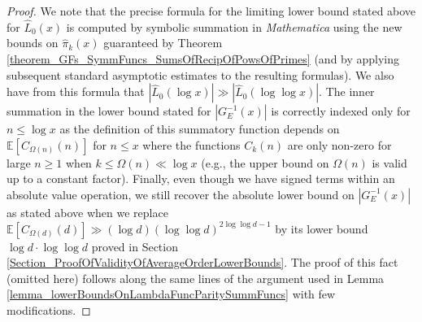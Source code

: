 \documentclass[11pt,reqno,a4letter]{article}
\numberwithin{figure}{section}
\numberwithin{table}{section}
\theoremstyle{plain}
\numberwithin{theorem}{section}
\theoremstyle{definition}
\begin{document}
\begin{proof}
We note that the precise formula for the 
limiting lower bound stated above for $\widehat{L}_0(x)$ is computed by symbolic summation 
in \emph{Mathematica} using the new bounds on $\widehat{\pi}_k(x)$ guaranteed by 
Theorem \ref{theorem_GFs_SymmFuncs_SumsOfRecipOfPowsOfPrimes} 
(and by applying subsequent standard asymptotic estimates to the resulting formulas). 
We also have from this formula that 
$\left\lvert \widehat{L}_0(\log x) \right\rvert \gg \left\lvert \widehat{L}_0(\log\log x) \right\rvert$. 
The inner summation in the lower bound stated for $|G_E^{-1}(x)|$ is correctly indexed only for 
$n \leq \log x$ as the definition of this summatory function depends on 
$\mathbb{E}[C_{\Omega(n)}(n)]$ for $n \leq x$ where the functions $C_k(n)$ are only non-zero for large 
$n \geq 1$ when $k \leq \Omega(n) \ll \log x$ (e.g., the upper bound on $\Omega(n)$ 
is valid up to a constant factor). 
Finally, even though we have signed terms within an absolute value operation, we still 
recover the absolute lower bound on $|G_E^{-1}(x)|$ as stated above 
when we replace $\mathbb{E}[C_{\Omega(d)}(d)] \gg (\log d) (\log\log d)^{2\log\log d - 1}$ 
by its lower bound $\log d \cdot \log\log d$ proved in 
Section \ref{Section_ProofOfValidityOfAverageOrderLowerBounds}. 
The proof of this fact (omitted here) follows along the same lines of the argument used in 
Lemma \ref{lemma_lowerBoundsOnLambdaFuncParitySummFuncs} with few modifications. 
\end{proof} 
\end{document}
